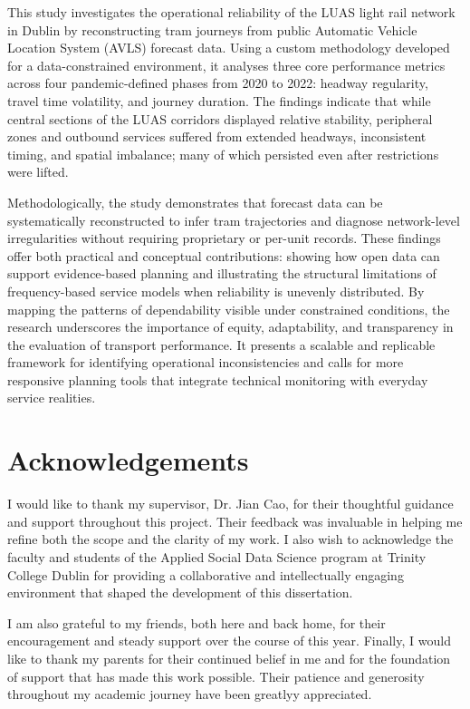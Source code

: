 This study investigates the operational reliability of the LUAS light rail network in Dublin by reconstructing tram journeys from public Automatic Vehicle Location System (AVLS) forecast data. Using a custom methodology developed for a data-constrained environment, it analyses three core performance metrics across four pandemic-defined phases from 2020 to 2022: headway regularity, travel time volatility, and journey duration. The findings indicate that while central sections of the LUAS corridors displayed relative stability, peripheral zones and outbound services suffered from extended headways, inconsistent timing, and spatial imbalance; many of which persisted even after restrictions were lifted.

Methodologically, the study demonstrates that forecast data can be systematically reconstructed to infer tram trajectories and diagnose network-level irregularities without requiring proprietary or per-unit records. These findings offer both practical and conceptual contributions: showing how open data can support evidence-based planning and illustrating the structural limitations of frequency-based service models when reliability is unevenly distributed. By mapping the patterns of dependability visible under constrained conditions, the research underscores the importance of equity, adaptability, and transparency in the evaluation of transport performance. It presents a scalable and replicable framework for identifying operational inconsistencies and calls for more responsive planning tools that integrate technical monitoring with everyday service realities.

\clearpage
\thispagestyle{plain}

\section*{Acknowledgements}

I would like to thank my supervisor, Dr. Jian Cao, for their thoughtful guidance and support throughout this project. Their feedback was invaluable in helping me refine both the scope and the clarity of my work. I also wish to acknowledge the faculty and students of the Applied Social Data Science program at Trinity College Dublin for providing a collaborative and intellectually engaging environment that shaped the development of this dissertation.


I am also grateful to my friends, both here and back home, for their encouragement and steady support over the course of this year. Finally, I would like to thank my parents for their continued belief in me and for the foundation of support that has made this work possible. Their patience and generosity throughout my academic journey have been greatlyy appreciated.

\clearpage
